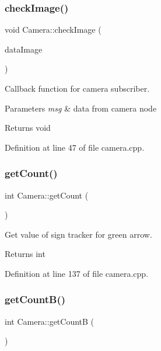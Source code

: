 \subsubsection{\texorpdfstring{check\+Image()}{checkImage()}}
{\footnotesize\ttfamily void Camera\+::check\+Image (\begin{DoxyParamCaption}\item[{const sensor\+\_\+msgs\+::\+Image\+::\+Const\+Ptr \&}]{data\+Image }\end{DoxyParamCaption})}



Callback function for camera subscriber. 


\begin{DoxyParams}{Parameters}
{\em msg} & data from camera node \\
\hline
\end{DoxyParams}
\begin{DoxyReturn}{Returns}
void 
\end{DoxyReturn}


Definition at line 47 of file camera.\+cpp.

\mbox{\label{class_camera_ac33d3b84891fdc56e4cce90e59be1905}} 
\subsubsection{\texorpdfstring{get\+Count()}{getCount()}}
{\footnotesize\ttfamily int Camera\+::get\+Count (\begin{DoxyParamCaption}{ }\end{DoxyParamCaption})}



Get value of sign tracker for green arrow. 

\begin{DoxyReturn}{Returns}
int 
\end{DoxyReturn}


Definition at line 137 of file camera.\+cpp.

\mbox{\label{class_camera_ae345bbfa5530387acf5143a3e70bf103}} 
\subsubsection{\texorpdfstring{get\+Count\+B()}{getCountB()}}
{\footnotesize\ttfamily int Camera\+::get\+CountB (\begin{DoxyParamCaption}{ }\end{DoxyParamCaption})}



